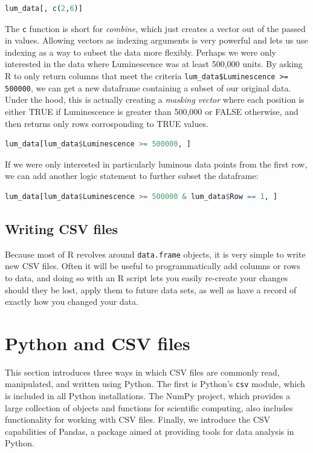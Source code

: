 \begin{lstlisting}[language=R]
lum_data[, c(2,6)]
\end{lstlisting}
The \lstinline!c! function is short for \emph{combine}, which just
creates a vector out of the passed in values. Allowing vectors as
indexing arguments is very powerful and lets us use indexing as a way to
subset the data more flexibly. Perhaps we were only interested in the
data where Luminescence was at least 500,000 units. By asking R to only
return columns that meet the criteria
\lstinline!lum_data$Luminescence >= 500000!, we can get a new dataframe
containing a subset of our original data. Under the hood, this is
actually creating a \emph{masking vector} where each position is either
TRUE if Luminescence is greater than 500,000 or FALSE otherwise, and
then returns only rows corrosponding to TRUE values.

\begin{lstlisting}[language=R]
lum_data[lum_data$Luminescence >= 500000, ]
\end{lstlisting}
If we were only interested in particularly luminous data points from the
first row, we can add another logic statement to further subset the
dataframe:

\begin{lstlisting}[language=R]
lum_data[lum_data$Luminescence >= 500000 & lum_data$Row == 1, ] 
\end{lstlisting}
\subsection{Writing CSV files}

Because most of R revolves around \lstinline!data.frame! objects, it is
very simple to write new CSV files. Often it will be useful to
programmatically add columns or rows to data, and doing so with an R
script lets you easily re-create your changes should they be lost, apply
them to future data sets, as well as have a record of exactly how you
changed your data.

\section{Python and CSV files}

This section introduces three ways in which CSV files are commonly read,
manipulated, and written using Python. The first is Python's
\lstinline!csv! module, which is included in all Python installations.
The NumPy project, which provides a large collection of objects and
functions for scientific computing, also includes functionality for
working with CSV files. Finally, we introduce the CSV capabilities of
Pandas, a package aimed at providing tools for data analysis in Python.

